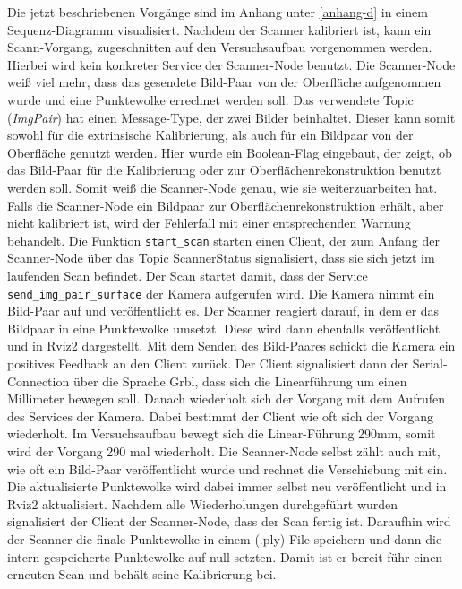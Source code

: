 		Die jetzt beschriebenen Vorgänge sind im Anhang unter \ref{anhang-d} in einem Sequenz-Diagramm visualisiert. \newline
		Nachdem der Scanner kalibriert ist, kann ein Scann-Vorgang, zugeschnitten auf den Versuchsaufbau vorgenommen werden. Hierbei wird kein konkreter Service der Scanner-Node benutzt. Die Scanner-Node weiß viel mehr, dass das gesendete Bild-Paar von der Oberfläche aufgenommen wurde und eine Punktewolke errechnet werden soll. Das verwendete Topic (\textit{ImgPair}) hat einen Message-Type, der zwei Bilder beinhaltet. Dieser kann somit sowohl für die extrinsische Kalibrierung, als auch für ein Bildpaar von der Oberfläche genutzt werden. Hier wurde ein Boolean-Flag eingebaut, der zeigt, ob das Bild-Paar für die Kalibrierung oder zur Oberflächenrekonstruktion benutzt werden soll. Somit weiß die Scanner-Node genau, wie sie weiterzuarbeiten hat. Falls die Scanner-Node ein Bildpaar zur Oberflächenrekonstruktion erhält, aber nicht kalibriert ist, wird der Fehlerfall mit einer entsprechenden Warnung behandelt. \newline
		Die Funktion \verb|start_scan| starten einen Client, der zum Anfang der Scanner-Node über das Topic ScannerStatus signalisiert, dass sie sich jetzt im laufenden Scan befindet. Der Scan startet damit, dass der Service \verb|send_img_pair_surface| der Kamera aufgerufen wird. Die Kamera nimmt ein Bild-Paar auf und veröffentlicht es. Der Scanner reagiert darauf, in dem er das Bildpaar in eine Punktewolke umsetzt. Diese wird dann ebenfalls veröffentlicht und in Rviz2 dargestellt. Mit dem Senden des Bild-Paares schickt die Kamera ein positives Feedback an den Client zurück. Der Client signalisiert dann der Serial-Connection über die Sprache Grbl, dass sich die Linearführung um einen Millimeter bewegen soll. Danach wiederholt sich der Vorgang mit dem Aufrufen des Services der Kamera. Dabei bestimmt der Client wie oft sich der Vorgang wiederholt. Im Versuchsaufbau bewegt sich die Linear-Führung 290mm, somit wird der Vorgang 290 mal wiederholt. Die Scanner-Node selbst zählt auch mit, wie oft ein Bild-Paar veröffentlicht wurde und rechnet die Verschiebung mit ein. Die aktualisierte Punktewolke wird dabei immer selbst neu veröffentlicht und in Rviz2 aktualisiert. \newline
		Nachdem alle Wiederholungen durchgeführt wurden signalisiert der Client der Scanner-Node, dass der Scan fertig ist. Daraufhin wird der Scanner die finale Punktewolke in einem (.ply)-File speichern und dann die intern gespeicherte Punktewolke auf null setzten. Damit ist er bereit führ einen erneuten Scan und behält seine Kalibrierung bei.
		
